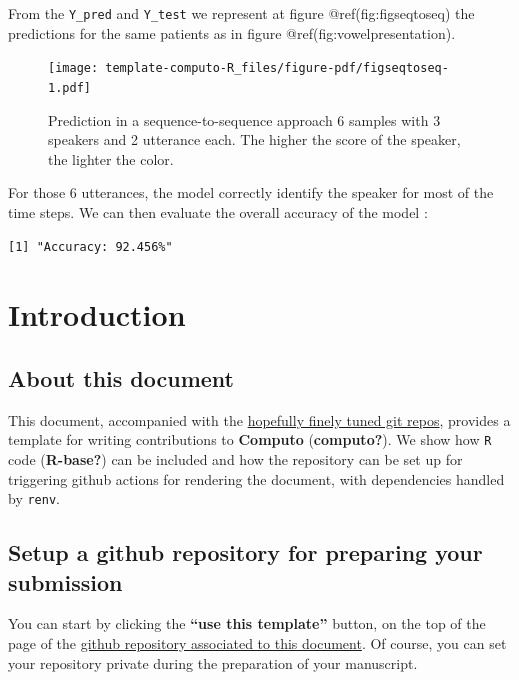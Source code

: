 \documentclass[
  11pt,
  a4paper,
]{article}
\theoremstyle{plain}
\theoremstyle{remark}
\begin{document}
From the \texttt{Y\_pred} and \texttt{Y\_test} we represent at figure
@ref(fig:figseqtoseq) the predictions for the same patients as in figure
@ref(fig:vowelpresentation).

\begin{figure}[H]

{\centering \texttt{[image: template-computo-R\_files/figure-pdf/figseqtoseq-1.pdf]}

}

\caption{Prediction in a sequence-to-sequence approach 6 samples with 3
speakers and 2 utterance each. The higher the score of the speaker, the
lighter the color.}

\end{figure}%

For those 6 utterances, the model correctly identify the speaker for
most of the time steps. We can then evaluate the overall accuracy of the
model :

\begin{verbatim}
[1] "Accuracy: 92.456%"
\end{verbatim}

\section{Introduction}\label{introduction-1}

\subsection{About this document}\label{about-this-document}

This document, accompanied with the
\href{https://github.com/computorg/template-computo-R/}{hopefully finely
tuned git repos}, provides a template for writing contributions to
\textbf{Computo} (\textbf{computo?}). We show how \texttt{R} code
(\textbf{R-base?}) can be included and how the repository can be set up
for triggering github actions for rendering the document, with
dependencies handled by \texttt{renv}.

\subsection{Setup a github repository for preparing your
submission}\label{setup-a-github-repository-for-preparing-your-submission}

You can start by clicking the \textbf{``use this template''} button, on
the top of the page of the
\href{https://github.com/computorg/template-computo-R/}{github
repository associated to this document}. Of course, you can set your
repository private during the preparation of your manuscript.
\end{document}
